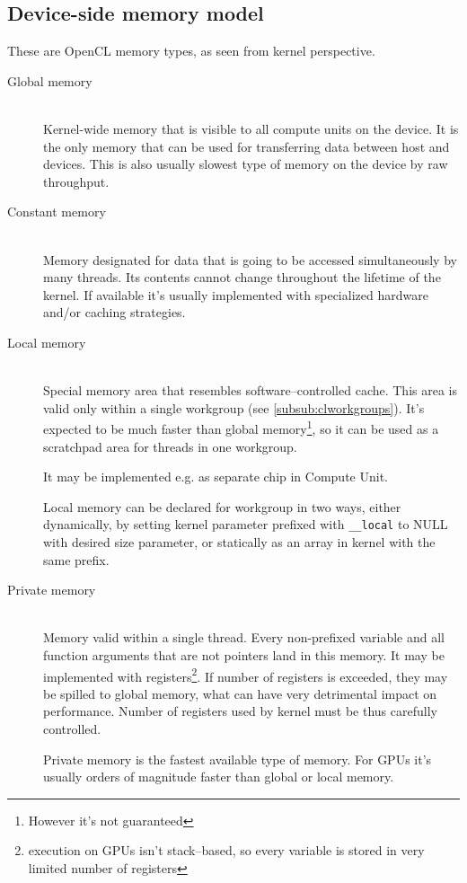 \subsection{Device-side memory model}

These are OpenCL memory types, as seen from kernel perspective.

\begin{description}
  \item[Global memory] \hfill \\
    Kernel-wide memory that is visible to all compute units on the device.
    It is the only memory that can be used for transferring data between host and
    devices. This is also usually slowest type of memory on the device by raw
    throughput.
  \item[Constant memory] \hfill \\
    Memory designated for data that is going to be accessed simultaneously by
    many threads. Its contents cannot change throughout the lifetime of the
    kernel. If available it's usually implemented with specialized hardware
    and/or caching strategies.
  \item[Local memory] \hfill \\
    Special memory area that resembles software--controlled cache. This area is
    valid only within a single workgroup (see \autoref{subsub:clworkgroups}). It's
    expected to be much faster than global memory\footnote{However it's not guaranteed},
    so it can be used as a scratchpad area for threads in one workgroup.

    It may be implemented e.g. as separate chip in Compute Unit.

    Local memory can be declared for workgroup in two ways, either dynamically,
    by setting kernel parameter prefixed with \texttt{\_\_local} to NULL with
    desired size parameter, or statically as an array in kernel with the same
    prefix.

  \item[Private memory] \hfill \\
    Memory valid within a single thread. Every non-prefixed variable and all function
    arguments that are not pointers land in this memory. It may be implemented
    with registers\footnote{execution on GPUs isn't stack--based, so every variable
    is stored in very limited number of registers}. If number of registers is
    exceeded, they may be spilled to global memory, what can have very
    detrimental impact on performance. Number of registers used by kernel must
    be thus carefully controlled.

    Private memory is the fastest available type of memory. For GPUs it's usually
    orders of magnitude faster than global or local memory.
\end{description}


